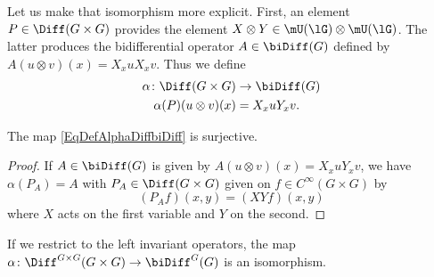 Let us make that isomorphism more explicit. First, an element $P\in\Diff(G\times G)$ provides the element $X\otimes Y\in\mU(\lG)\otimes\mU(\lG)$. The latter produces the bidifferential operator $A\in\biDiff(G)$ defined by $A(u\otimes v)(x)=X_xuX_xv$. Thus we define
\begin{equation}		\label{EqDefAlphaDiffbiDiff}
	\begin{aligned}
		\alpha\colon \Diff(G\times G)&\to \biDiff(G) \\
		\alpha(P)(u\otimes v)(x)&=X_xuY_xv.
	\end{aligned}
\end{equation}

\begin{lemma}
	The map \eqref{EqDefAlphaDiffbiDiff} is surjective.
\end{lemma}

\begin{proof}
	If $A\in\biDiff(G)$ is given by $A(u\otimes v)(x)=X_xuY_xv$, we have $\alpha(P_A)=A$ with $P_A\in\Diff(G\times G)$ given on $f\in C^{\infty}(G\times G)$ by
	\begin{equation}
		(P_Af)(x,y)=(XYf)(x,y)
	\end{equation}
	where $X$ acts on the first variable and $Y$ on the second.
\end{proof}

\begin{proposition}
	If we restrict to the left invariant operators, the map $\alpha\colon \Diff^{G\times G}(G\times G)\to \biDiff^G(G)$ is an isomorphism.
\end{proposition}

